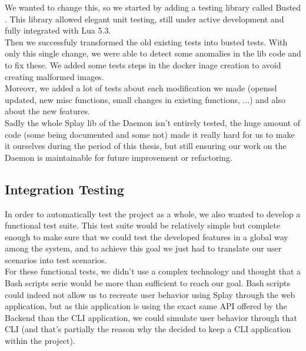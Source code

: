 \documentclass{eplmastersthesis}
\begin{document}
        We wanted to change this, so we started by adding a testing library
        called Busted \cite{busted}. This library allowed elegant unit testing,
        still under active development and fully integrated with Lua 5.3.\\
        Then we successfuly transformed the old existing tests into busted
        tests. With only this single change, we were able to detect some
        anomalies in the lib code and to fix these. We added some tests steps
        in the docker inage creation to avoid creating malformed images.\\

        Moreovr, we added a lot of tests about each modification we made
        (openssl updated, new misc functions, small changes in existing
        functions, ...) and also about the new features.\\
        Sadly the whole Splay lib of the Daemon isn't entirely tested,
        the huge amount of code (some being documented and some not) made it
        really hard for us to make it ourselves during the period of this
        thesis, but still ensuring our work on the Daemon is maintainable
        for future improvement or refactoring.

      \subsection{Integration Testing}

        In order to automatically test the project as a whole, we also wanted to
        develop a functional test suite. This test suite would be relatively
        simple but complete enough to make sure that we could test the developed
        features in a global way among the system, and to achieve this goal we
        just had to translate our user scenarios into test scenarios.\\

        For these functional tests, we didn't use a complex technology and
        thought that a Bash scripts serie would be more than sufficient to
        reach our goal. Bash scripts could indeed not allow us to recreate user
        behavior using Splay through the web application, but as this
        application is using the exact same API offered by the Backend than the
        CLI application, we could simulate user behavior through that CLI (and
        that's partially the reason why the decided to keep a CLI application
        within the project).\\
\end{document}
